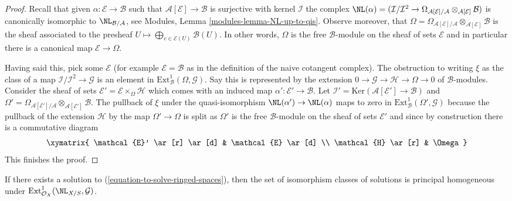 \begin{proof}
Recall that given $\alpha : \mathcal{E} \to \mathcal{B}$
such that $\mathcal{A}[\mathcal{E}] \to \mathcal{B}$ is surjective
with kernel $\mathcal{I}$ the complex
$\NL(\alpha) = (\mathcal{I}/\mathcal{I}^2 \to 
\Omega_{\mathcal{A}[\mathcal{E}]/\mathcal{A}}
\otimes_{\mathcal{A}[\mathcal{E}]} \mathcal{B})$ is canonically
isomorphic to $\NL_{\mathcal{B}/\mathcal{A}}$, see
Modules, Lemma \ref{modules-lemma-NL-up-to-qis}.
Observe moreover, that
$\Omega = \Omega_{\mathcal{A}[\mathcal{E}]/\mathcal{A}}
\otimes_{\mathcal{A}[\mathcal{E}]} \mathcal{B}$ is the sheaf
associated to the presheaf
$U \mapsto \bigoplus_{e \in \mathcal{E}(U)} \mathcal{B}(U)$.
In other words, $\Omega$ is the free $\mathcal{B}$-module on the
sheaf of sets $\mathcal{E}$ and in particular there is a canonical
map $\mathcal{E} \to \Omega$.

\medskip\noindent
Having said this, pick some $\mathcal{E}$ (for example
$\mathcal{E} = \mathcal{B}$ as in the definition of the naive cotangent
complex). The obstruction to writing $\xi$ as the class of a map
$\mathcal{I}/\mathcal{I}^2 \to \mathcal{G}$ is an element in
$\text{Ext}^1_\mathcal{B}(\Omega, \mathcal{G})$. Say this is represented
by the extension $0 \to \mathcal{G} \to \mathcal{H} \to \Omega \to 0$
of $\mathcal{B}$-modules. Consider the sheaf of sets
$\mathcal{E}' = \mathcal{E} \times_\Omega \mathcal{H}$
which comes with an induced map $\alpha' : \mathcal{E}' \to \mathcal{B}$.
Let $\mathcal{I}' = \text{Ker}(\mathcal{A}[\mathcal{E}'] \to \mathcal{B})$
and $\Omega' = \Omega_{\mathcal{A}[\mathcal{E}']/\mathcal{A}}
\otimes_{\mathcal{A}[\mathcal{E}']} \mathcal{B}$.
The pullback of $\xi$ under the quasi-isomorphism
$\NL(\alpha') \to \NL(\alpha)$ maps to zero in
$\text{Ext}^1_\mathcal{B}(\Omega', \mathcal{G})$
because the pullback of the extension $\mathcal{H}$
by the map $\Omega' \to \Omega$ is split as $\Omega'$ is the free
$\mathcal{B}$-module on the sheaf of sets $\mathcal{E}'$ and since
by construction there is a commutative diagram
$$
\xymatrix{
\mathcal{E}' \ar[r] \ar[d] & \mathcal{E} \ar[d] \\
\mathcal{H} \ar[r] & \Omega
}
$$
This finishes the proof.
\end{proof}

\begin{lemma}
\label{lemma-choices-ringed-spaces}
If there exists a solution to (\ref{equation-to-solve-ringed-spaces}),
then the set of isomorphism classes of solutions is principal homogeneous
under $\text{Ext}^1_{\mathcal{O}_X}(\NL_{X/S}, \mathcal{G})$.
\end{lemma}

